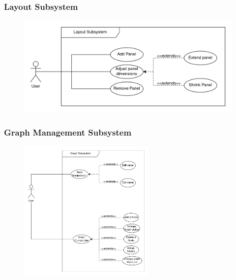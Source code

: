 \documentclass[11pt,a4paper]{article}
\begin{document}
\pagebreak
\subsubsection*{Layout Subsystem}
\begin{figure}[htbp]
    \centering
     \href{https://drive.google.com/drive/u/2/folders/18FJi5U-PEzTiB-SsYfPQOV304R0K7s3H}
     {\includegraphics[width=1\textwidth]{../diagramPng/Usecase Layout-Subsystem.png}}
\end{figure}

\subsubsection*{Graph Management Subsystem}
\begin{figure}[htbp]
    \centering
    \href{https://drive.google.com/drive/u/2/folders/18FJi5U-PEzTiB-SsYfPQOV304R0K7s3H}
    {\includegraphics[width=0.6\textwidth]{../diagramPng/Usecase Graph-Subsystem.png}}
\end{figure}

\pagebreak
\end{document}
